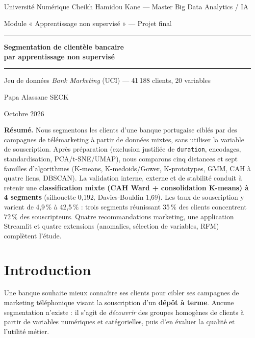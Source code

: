 \documentclass[11pt,a4paper]{article}
\begin{document}
\begin{titlepage}
\centering
\vspace*{2cm}
{\large Université Numérique Cheikh Hamidou Kane — Master Big Data Analytics / IA\par}
\vspace{.3cm}
{\large Module « Apprentissage non supervisé » — Projet final\par}
\vspace{2.5cm}
{\color{bleu}\rule{\linewidth}{1pt}\par\vspace{.4cm}
{\Huge\bfseries Segmentation de clientèle bancaire\\[.2cm] par apprentissage non supervisé\par}
\vspace{.4cm}\rule{\linewidth}{1pt}\par}
\vspace{1cm}
{\large Jeu de données \textit{Bank Marketing} (UCI) — 41\,188 clients, 20 variables\par}
\vspace{3cm}
{\Large Papa Alassane SECK\par}
\vspace{.3cm}
{\large Octobre 2026\par}
\vfill
\begin{minipage}{.85\linewidth}\small
\textbf{Résumé.} Nous segmentons les clients d'une banque portugaise ciblés par des campagnes de télémarketing à partir de données mixtes, sans utiliser la variable de souscription. Après préparation (exclusion justifiée de \texttt{duration}, encodages, standardisation, PCA/t-SNE/UMAP), nous comparons cinq distances et sept familles d'algorithmes (K-means, K-medoids/Gower, K-prototypes, GMM, CAH à quatre liens, DBSCAN). La validation interne, externe et de stabilité conduit à retenir une \textbf{classification mixte (CAH Ward + consolidation K-means) à 4 segments} (silhouette 0,192, Davies-Bouldin 1,69). Les taux de souscription y varient de 4,9\,\% à 42,5\,\% : trois segments réunissant 35\,\% des clients concentrent 72\,\% des souscripteurs. Quatre recommandations marketing, une application Streamlit et quatre extensions (anomalies, sélection de variables, RFM) complètent l'étude.
\end{minipage}
\end{titlepage}

\tableofcontents
\newpage

\section{Introduction}
Une banque souhaite mieux connaître ses clients pour cibler ses campagnes de marketing téléphonique visant la souscription d'un \textbf{dépôt à terme}. Aucune segmentation n'existe : il s'agit de \emph{découvrir} des groupes homogènes de clients à partir de variables numériques et catégorielles, puis d'en évaluer la qualité et l'utilité métier.
\end{document}
